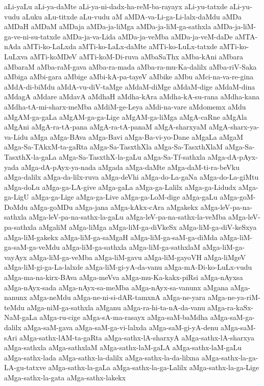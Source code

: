{aLi-yaLu
aLi-ya-daMte
aLi-ya-ni-dadx-ha-reM-ba-rayayx
aLi-yu-tatxde
aLi-yu-vudu
aLuku
aLu-titxde
aLu-vudu
aM
aMDA-va-Li-ga-Li-lalx-daMdu
aMDa
aMDaH
aMDaM
aMDaja
aMDa-ja-liMga
aMDa-ja-liM-ga-sathxla
aMDa-ja-liM-ga-ve-ni-su-tatxde
aMDa-ja-va-Lida
aMDa-ja-veMba
aMDa-ja-veM-daDe
aMTA-nAda
aMTi-ko-LaLxda
aMTi-ko-LaLx-daMte
aMTi-ko-LuLx-tatxde
aMTi-ko-LuLxva
aMTi-koMDeV
aMTi-koM-Di-ruva
aMbaSaThx
aMba-kAni
aMbara
aMbaraM
aMba-raM-gava
aMba-ra-mada
aMba-ra-mu-Ka-dalilx
aMba-riV-Saka
aMbiga
aMbi-gara
aMbige
aMbi-kA-pa-tayeV
aMbike
aMbu
aMci-na-va-re-gina
aMdA-di-biMdu
aMdA-vu-diV-taMge
aMdaM-diMge
aMdaM-dige
aMdaM-dina
aMdagA
aMdare
aMdavA
aMdhaH
aMdha-kAra
aMdha-kA-su-rana
aMdha-kana
aMdha-tA-mi-sharx-meMba
aMdiM-ge-Leya
aMdi-na-vare
aMdomemx
aMdu
aMgAM-ga-gaLa
aMgAM-ga-ga-Lige
aMgAM-ga-liMga
aMgA-caRne
aMgAla
aMgAni
aMgA-ra-tA-pana
aMgA-ra-tA-panaM
aMgA-sharxyaM
aMgA-sharx-ya-va-Lidu
aMga
aMga-BAva
aMga-Bavi
aMga-Ba-vi-yo-Dane
aMgaLa
aMgaM
aMga-Sa-TAkxM-ta-gaRta
aMga-Sa-TasxthXla
aMga-Sa-TasxthXlaM
aMga-Sa-TasxthX-la-gaLa
aMga-Sa-TasxthX-la-gaLu
aMga-Sa-Tf-sathxla
aMga-dA-pAyx-yada
aMga-dA-pAyx-ya-nada
aMgada
aMga-daMte
aMga-daM-ti-ra-beVku
aMga-dalilx
aMga-da-lilx-ruva
aMga-deVhi
aMga-do-La-gaNa
aMga-do-La-giMtu
aMga-doLu
aMga-ga-LA-give
aMga-gaLa
aMga-ga-Lalilx
aMga-ga-Lidudx
aMga-ga-LigU
aMga-ga-Lige
aMga-ga-Live
aMga-ga-LoM-dige
aMga-gaLu
aMga-goM-DoMdu
aMga-goMDu
aMga-jana
aMga-kAkx-cAra
aMgakekx
aMga-leV-pa-na-sathxla
aMga-leV-pa-na-sathx-la-gaLu
aMga-leV-pa-na-sathx-la-veMba
aMga-leV-pa-sathxla
aMgaliM
aMga-liMga
aMga-liM-ga-diVkeSx
aMga-liM-ga-diV-keSxya
aMga-liM-gakekx
aMga-liM-ga-saMgaH
aMga-liM-ga-saM-ga-diMda
aMga-liM-ga-saM-ga-veMdu
aMga-liM-ga-sathxla
aMga-liM-ga-sathxlaM
aMga-liM-ga-vayAyx
aMga-liM-ga-veMba
aMga-liM-gavu
aMga-liM-gayoVH
aMga-liMgeV
aMga-liM-gi-ga-La-lalxde
aMga-liM-gi-yA-da-vanu
aMga-mA-Di-ko-LuLx-vudu
aMga-ma-na-kirx-BAva
aMga-meVva
aMga-mu-Ka-kakx-piRsi
aMga-nAyxsa
aMga-nAyx-sada
aMga-nAyx-sa-meMba
aMga-nAyx-sa-vanunx
aMgana
aMga-nanunx
aMga-neMdu
aMga-ne-ni-si-dAR-tamxnA
aMga-ne-yara
aMga-ne-ya-riM-teMdu
aMga-niM-ga-sathxla
aMganu
aMga-ra-hi-ta-nA-da-vanu
aMga-ra-kaSx-NaM-gaLa
aMga-ru-cige
aMga-sA-ma-rasayx
aMga-saM-baMdha
aMga-saM-ga-dalilx
aMga-saM-gava
aMga-saM-ga-vi-lalxda
aMga-saM-gi-yA-denu
aMga-saM-sAri
aMga-sathx-lAM-ta-gaRta
aMga-sathx-lA-sharxyA
aMga-sathx-lA-sharxya
aMga-sathxla
aMga-sathxlaM
aMga-sathx-laM-gaLA
aMga-sathx-laM-gaLu
aMga-sathx-lada
aMga-sathx-la-dalilx
aMga-sathx-la-da-lilxna
aMga-sathx-la-ga-LA-gu-tatxve
aMga-sathx-la-gaLa
aMga-sathx-la-ga-Lalilx
aMga-sathx-la-ga-Lige
aMga-sathx-la-gata
aMga-sathx-lakekx
}
